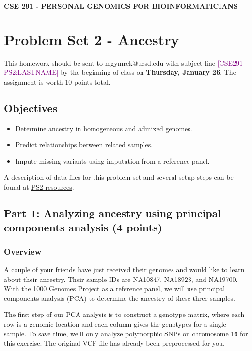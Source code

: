 \documentclass[12pt]{article}
\begin{document}
\textbf{CSE 291 - PERSONAL GENOMICS FOR BIOINFORMATICIANS}

\section*{Problem Set 2 - Ancestry}

This homework should be sent to mgymrek@ucsd.edu with subject line \textcolor{purple}{[CSE291 PS2:LASTNAME]} by the beginning of class on \textbf{Thursday, January 26}. The assignment is worth 10 points total.

\subsection*{Objectives}
\begin{itemize}
\setlength\itemsep{0.0em}
\item Determine ancestry in homogeneous and admixed genomes.
\item Predict relationships between related samples.
\item Impute missing variants using imputation from a reference panel.
\end{itemize}

A description of data files for this problem set and several setup steps can be found at \href{https://gymreklab.github.io/teaching/personal\_genomics/ps2\_resources.html}{PS2 resources}. 

\subsection*{Part 1: Analyzing ancestry using principal components analysis (4 points)}

\subsubsection*{Overview}

A couple of your friends have just received their genomes and would like to learn about their ancestry. Their sample IDs are NA10847, NA18923, and NA19700. With the 1000 Genomes Project as a reference panel, we will use principal components analysis (PCA) to determine the ancestry of these three samples.

The first step of our PCA analysis is to construct a genotype matrix, where each row is a genomic location and each column gives the genotypes for a single sample. To save time, we'll only analyze polymorphic SNPs on chromosome 16 for this exercise. The original VCF file has already been preprocessed for you.
\end{document}
